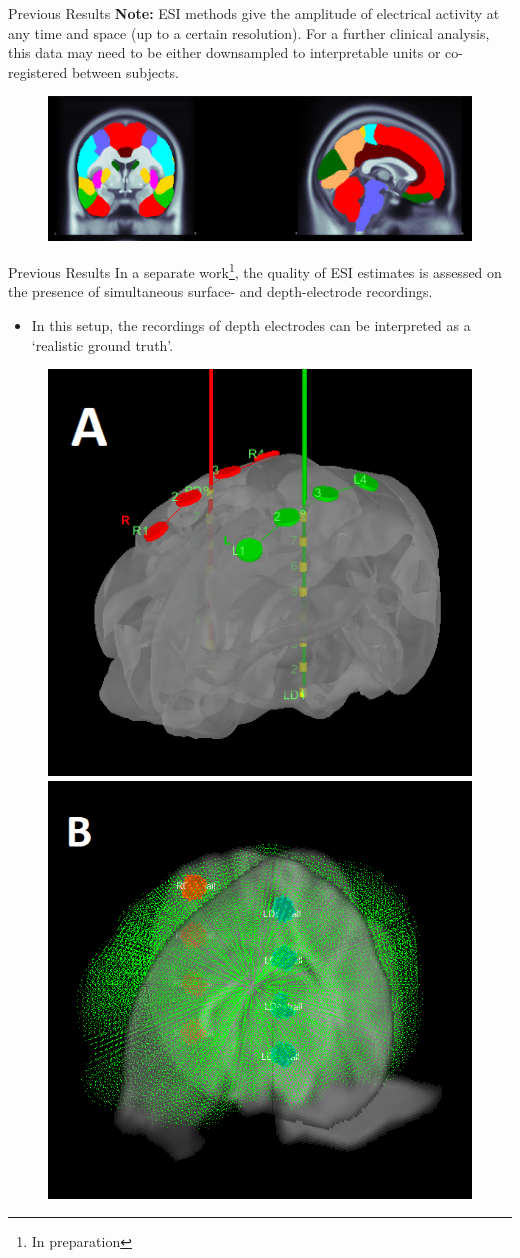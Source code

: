 \documentclass[progressbar=head]{beamer}
\begin{document}
\begin{frame}{Previous Results}
\textbf{Note:} ESI methods give the amplitude of electrical activity at any time and space (up to a certain resolution). 
For a 
further clinical analysis,
this data may need to be either downsampled to interpretable units or co-registered between subjects.

\begin{figure}
\centering
\includegraphics[width=0.9\linewidth]{./img_oldbeamer/MriViewer_Subject02_protocol1_LPBA40_v2}
\end{figure}
\end{frame}

\begin{frame}{Previous Results}
In a separate work\footnote{In preparation}, the quality of ESI estimates is assessed on the presence of 
simultaneous surface- and depth-electrode recordings.
\begin{itemize}
\item In this setup, the recordings of depth electrodes can be interpreted as a
`realistic ground truth'.
\end{itemize}

\begin{figure}
\centering
\includegraphics[width=0.35\linewidth]{./img_oldbeamer/positions02_v2}
\includegraphics[width=0.35\linewidth]{./img_oldbeamer/positions01_v2}
\end{figure}
\end{frame}
\end{document}
